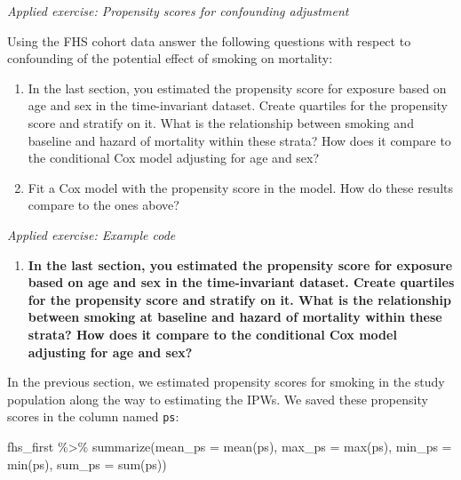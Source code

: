 \documentclass[
]{book}
\newenvironment{Shaded}{\begin{snugshade}}{\end{snugshade}}
\newcommand{\AttributeTok}[1]{\textcolor[rgb]{0.77,0.63,0.00}{#1}}
\newcommand{\FunctionTok}[1]{\textcolor[rgb]{0.00,0.00,0.00}{#1}}
\newcommand{\NormalTok}[1]{#1}
\newcommand{\SpecialCharTok}[1]{\textcolor[rgb]{0.00,0.00,0.00}{#1}}
\providecommand{\tightlist}{%
  \setlength{\itemsep}{0pt}\setlength{\parskip}{0pt}}
\begin{document}
\emph{Applied exercise: Propensity scores for confounding adjustment}

Using the FHS cohort data answer the following questions with respect to confounding of the potential effect of smoking on mortality:

\begin{enumerate}
\def\labelenumi{\arabic{enumi}.}
\tightlist
\item
  In the last section, you estimated the propensity score for exposure based on age and sex in the time-invariant dataset. Create quartiles for the propensity score and stratify on it. What is the relationship between smoking and baseline and hazard of mortality within these strata? How does it compare to the conditional Cox model adjusting for age and sex?
\item
  Fit a Cox model with the propensity score in the model. How do these results compare to the ones above?
\end{enumerate}

\emph{Applied exercise: Example code}

\begin{enumerate}
\def\labelenumi{\arabic{enumi}.}
\tightlist
\item
  \textbf{In the last section, you estimated the propensity score for exposure based on age and sex in the time-invariant dataset. Create quartiles for the propensity score and stratify on it. What is the relationship between smoking at baseline and hazard of mortality within these strata? How does it compare to the conditional Cox model adjusting for age and sex?}
\end{enumerate}

In the previous section, we estimated propensity scores for smoking in the study population along the way to estimating the IPWs. We saved these propensity scores in the column named \texttt{ps}:

\begin{Shaded}
\begin{Highlighting}[]
\NormalTok{fhs\_first }\SpecialCharTok{\%\textgreater{}\%}
  \FunctionTok{summarize}\NormalTok{(}\AttributeTok{mean\_ps =} \FunctionTok{mean}\NormalTok{(ps),}
            \AttributeTok{max\_ps =} \FunctionTok{max}\NormalTok{(ps),}
            \AttributeTok{min\_ps =} \FunctionTok{min}\NormalTok{(ps),}
            \AttributeTok{sum\_ps =} \FunctionTok{sum}\NormalTok{(ps))}
\end{Highlighting}
\end{Shaded}
\end{document}
